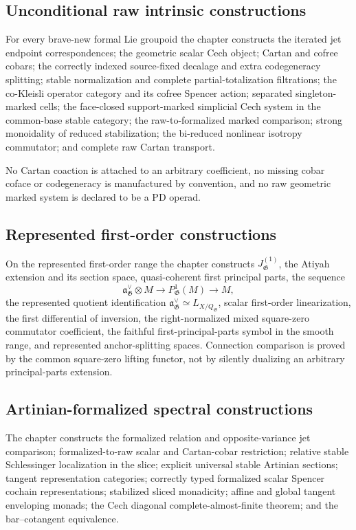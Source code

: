 \subsection{Unconditional raw intrinsic constructions}

For every brave-new formal Lie groupoid the chapter constructs the iterated
jet endpoint correspondences; the geometric scalar Cech object; Cartan and
cofree cobars; the correctly indexed source-fixed decalage and extra
codegeneracy splitting; stable normalization and complete partial-totalization
filtrations; the co-Kleisli operator category and its cofree Spencer action;
separated singleton-marked cells; the face-closed support-marked simplicial
Cech system in the common-base stable category; the raw-to-formalized marked
comparison; strong monoidality of reduced stabilization; the bi-reduced
nonlinear isotropy commutator; and complete raw Cartan transport.

No Cartan coaction is attached to an arbitrary coefficient, no missing cobar
coface or codegeneracy is manufactured by convention, and no raw geometric
marked system is declared to be a PD operad.

\subsection{Represented first-order constructions}

On the represented first-order range the chapter constructs
$J_{\mathfrak G}^{(1)}$, the Atiyah extension and its section space,
quasi-coherent first principal parts, the sequence
\[
    \mathfrak a_{\mathfrak G}^\vee\otimes M
    \longrightarrow
    P^1_{\mathfrak G}(M)
    \longrightarrow
    M,
\]
the represented quotient identification
$\mathfrak a_{\mathfrak G}^\vee\simeq L_{X/Q_{\mathfrak G}}$, scalar
first-order linearization, the first differential of inversion, the
right-normalized mixed square-zero commutator coefficient, the faithful
first-principal-parts symbol in the smooth range, and represented
anchor-splitting spaces.  Connection comparison is proved by the common
square-zero lifting functor, not by silently dualizing an arbitrary
principal-parts extension.

\subsection{Artinian-formalized spectral constructions}

The chapter constructs the formalized relation and opposite-variance jet
comparison; formalized-to-raw scalar and Cartan-cobar restriction; relative
stable Schlessinger localization in the slice; explicit universal stable
Artinian sections; tangent representation categories; correctly typed
formalized scalar Spencer cochain representations; stabilized sliced
monadicity; affine and global tangent enveloping monads; the Cech diagonal
complete-almost-finite theorem; and the bar--cotangent equivalence.


